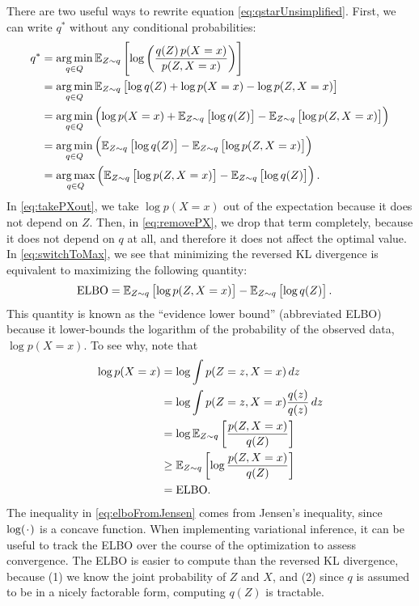 \documentclass[11pt]{article}
\newcommand*{\placeholder}{\makebox[1ex]{$\cdot$}}
\begin{document}
There are two useful ways to rewrite equation \eqref{eq:qstarUnsimplified}.
First, we can write $q^*$ without any conditional probabilities:
\begin{align}
q^*
&= \operatorname*{arg\,min}_{q \in Q} \mathbb{E}_{\substack{Z \sim q}}\left[  \log \left( \frac{q(Z) \, p(X = x)}{p(Z, X = x)} \right)  \right] \\
&= \operatorname*{arg\,min}_{q \in Q} \mathbb{E}_{\substack{Z \sim q}}\left[  \log q(Z) + \log p(X = x) - \log p(Z, X = x)  \right] \\
\label{eq:takePXout}
&= \operatorname*{arg\,min}_{q \in Q} \left(
    \log p(X = x) + \mathbb{E}_{\substack{Z \sim q}}\left[  \log q(Z)  \right] - \mathbb{E}_{\substack{Z \sim q}}\left[  \log p(Z, X = x)  \right]
    \right) \\
\label{eq:removePX}
&= \operatorname*{arg\,min}_{q \in Q} \left(
    \mathbb{E}_{\substack{Z \sim q}}\left[  \log q(Z)  \right] - \mathbb{E}_{\substack{Z \sim q}}\left[  \log p(Z, X = x)  \right]
    \right) \\
\label{eq:switchToMax}
&= \operatorname*{arg\,max}_{q \in Q} \left(
    \mathbb{E}_{\substack{Z \sim q}}\left[  \log p(Z, X = x)  \right] - \mathbb{E}_{\substack{Z \sim q}}\left[  \log q(Z)  \right]
\right).
\end{align}
In \eqref{eq:takePXout}, we take $\log p(X = x)$ out of the expectation because it does not depend on $Z$.
Then, in \eqref{eq:removePX}, we drop that term completely, because it does not depend on $q$ at all, and therefore it does not affect the optimal value.
In \eqref{eq:switchToMax}, we see that minimizing the reversed KL divergence is equivalent to maximizing the following quantity:
\begin{align}
\label{eq:ELBO}
\mathrm{ELBO}
&= \mathbb{E}_{\substack{Z \sim q}}\left[  \log p(Z, X = x)  \right] - \mathbb{E}_{\substack{Z \sim q}}\left[  \log q(Z)  \right].
\end{align}
This quantity is known as the ``evidence lower bound'' (abbreviated ELBO) because it lower-bounds the logarithm of the probability of the observed data, $\log p(X = x)$.
To see why, note that
\begin{align}
\log p(X = x)
&= \log \int p(Z = z, X = x) \, dz \\
&= \log \int p(Z = z, X = x) \frac{q(z)}{q(z)} \, dz \\
&= \log \mathbb{E}_{\substack{Z \sim q}}\left[  \frac{p(Z, X=x)}{q(Z)}  \right] \\
\label{eq:elboFromJensen}
&\geq \mathbb{E}_{\substack{Z \sim q}}\left[  \log \frac{p(Z, X=x)}{q(Z)}  \right] \\
&= \mathrm{ELBO}.
\end{align}
The inequality in \eqref{eq:elboFromJensen} comes from Jensen's inequality, since $\log(\placeholder)$ is a concave function.
When implementing variational inference, it can be useful to track the ELBO over the course of the optimization to assess convergence.
The ELBO is easier to compute than the reversed KL divergence, because (1) we know the joint probability of $Z$ and $X$, and (2) since $q$ is assumed to be in a nicely factorable form, computing $q(Z)$ is tractable.
\end{document}

